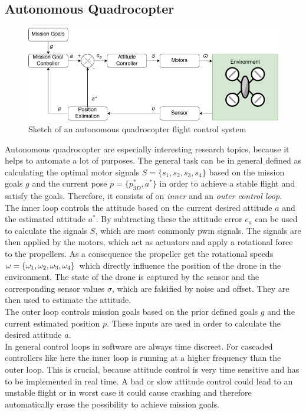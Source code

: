\subsection{Autonomous Quadrocopter} \label{sec: autoquad}
\begin{figure}
	\centering
	\includegraphics[width=\linewidth]{figures/autoquad.png}
	\caption{Sketch of an autonomous quadrocopter flight control system}
	\label{fig:autoquad}
\end{figure}
Autonomous quadrocopter are especially interesting research topics, because it helps to automate a lot of purposes. 
The general task can be in general defined as calculating the optimal motor signals $S = \{s_1, s_2, s_3, s_4\}$ 
based on the mission goals $g$ and the current pose $p = \{ p_{3D}^*, a^*\}$ in order to achieve a stable flight and satisfy the goals. 
Therefore, it consists of on \emph{inner} and an \emph{outer control loop}.\\
\newline
The inner loop controls the attitude based on the current desired attitude $a$ and the estimated attitude $a^*$. 
By subtracting these the attitude error $e_a$ can be used to calculate the signals $S$, which are most commonly pwm signals. 
The signals are then applied by the motors, which act as actuators and apply a rotational force to the propellers. 
As a consequence the propeller get the rotational speeds ${\Huge \omega } = \{ \omega_1, \omega_2, \omega_3, \omega_4 \}$ 
which directly influence the position of the drone in the environment. 
The state of the drone is captured by the sensor and the corresponding sensor values $\sigma$, which are falsified by noise and offset. 
They are then used to estimate the attitude. \\
The outer loop controls mission goals based on the prior defined goals $g$ and the current estimated position $p$. 
These inputs are used in order to calculate the desired attitude $a$.\\
\newline
In general control loops in software are always time discreet. For cascaded controllers like here the inner loop
is running at a higher frequency than the outer loop. 
This is crucial, because attitude control is very time sensitive and has to be implemented in real time. 
A bad or slow attitude control could lead to an unstable flight or in worst case it could cause crashing and therefore automatically erase the possibility to achieve mission goals.\\

